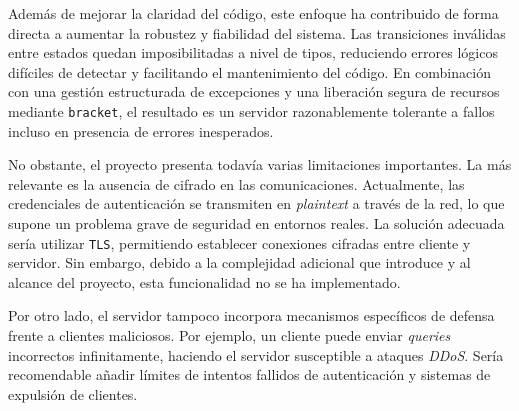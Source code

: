 \documentclass[a4paper]{CSMakotoTechnicalReport}
\begin{document}
Además de mejorar la claridad del código, este enfoque ha contribuido de forma directa a aumentar la robustez y fiabilidad del sistema. Las transiciones inválidas entre estados quedan imposibilitadas a nivel de tipos, reduciendo errores lógicos difíciles de detectar y facilitando el mantenimiento del código. En combinación con una gestión estructurada de excepciones y una liberación segura de recursos mediante \texttt{bracket}, el resultado es un servidor razonablemente tolerante a fallos incluso en presencia de errores inesperados.

No obstante, el proyecto presenta todavía varias limitaciones importantes. La más relevante es la ausencia de cifrado en las comunicaciones. Actualmente, las credenciales de autenticación se transmiten en \textit{plaintext} a través de la red, lo que supone un problema grave de seguridad en entornos reales. La solución adecuada sería utilizar \texttt{TLS}, permitiendo establecer conexiones cifradas entre cliente y servidor. Sin embargo, debido a la complejidad adicional que introduce y al alcance del proyecto, esta funcionalidad no se ha implementado.

Por otro lado, el servidor tampoco incorpora mecanismos específicos de defensa frente a clientes maliciosos. Por ejemplo, un cliente puede enviar \textit{queries} incorrectos infinitamente, haciendo el servidor susceptible a ataques \textit{DDoS}. Sería recomendable añadir límites de intentos fallidos de autenticación y sistemas de expulsión de clientes.


\printbibliography

\end{document}
